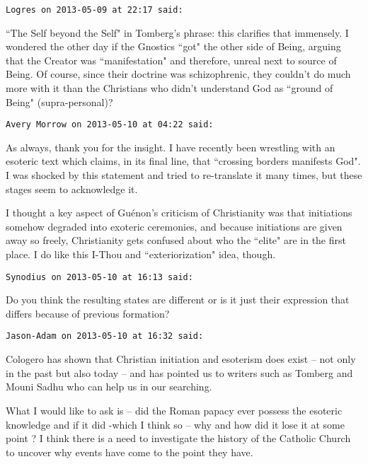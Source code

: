 \begin{footnotesize}\begin{sffamily}



\texttt{Logres on 2013-05-09 at 22:17 said: }

``The Self beyond the Self" in Tomberg's phrase: this clarifies that immensely. I wondered the other day if the Gnostics ``got" the other side of Being, arguing that the Creator was ``manifestation" and therefore, unreal next to source of Being. Of course, since their doctrine was schizophrenic, they couldn't do much more with it than the Christians who didn't understand God as ``ground of Being" (supra-personal)?


\hfill

\texttt{Avery Morrow on 2013-05-10 at 04:22 said: }

As always, thank you for the insight. I have recently been wrestling with an esoteric text which claims, in its final line, that ``crossing borders manifests God". I was shocked by this statement and tried to re-translate it many times, but these stages seem to acknowledge it.

I thought a key aspect of Guénon's criticism of Christianity was that initiations somehow degraded into exoteric ceremonies, and because initiations are given away so freely, Christianity gets confused about who the ``elite" are in the first place. I do like this I-Thou and ``exteriorization" idea, though.


\hfill

\texttt{Synodius on 2013-05-10 at 16:13 said: }

Do you think the resulting states are different or is it just their expression that differs because of previous formation?


\hfill

\texttt{Jason-Adam on 2013-05-10 at 16:32 said: }

Cologero has shown that Christian initiation and esoterism does exist – not only in the past but also today – and has pointed us to writers such as Tomberg and Mouni Sadhu who can help us in our searching. 

What I would like to ask is – did the Roman papacy ever possess the esoteric knowledge and if it did -which I think so – why and how did it lose it at some point ? I think there is a need to investigate the history of the Catholic Church to uncover why events have come to the point they have.


\hfill


\end{sffamily}
\end{footnotesize}
